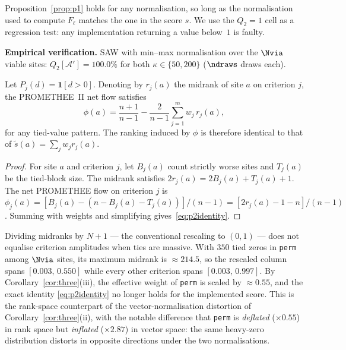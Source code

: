 \begin{remark}
Proposition~\ref{prop:p1} holds for any normalisation, so long as the
normalisation used to compute $F_\ell$ matches the one in the score $s$.
We use the $Q_2 = 1$ cell as a regression test: any implementation
returning a value below~$1$ is faulty.
\end{remark}

\noindent\textbf{Empirical verification.}
SAW with min--max normalisation over the $\Nvia$ viable sites:
$Q_2[\mathcal{A}'] = 100.0\%$ for both $\kappa \in \{50, 200\}$
($\ndraws$ draws each).



\begin{proposition}
\label{prop:p2}
Let $P_j(d) = \mathbf{1}[d > 0]$.
Denoting by $r_j(a)$ the midrank of site $a$ on criterion $j$, the
PROMETHEE~II net flow satisfies
\begin{equation}
  \label{eq:p2identity}
  \phi(a) = \frac{n+1}{n-1} - \frac{2}{n-1}\sum_{j=1}^m w_j\, r_j(a),
\end{equation}
for any tied-value pattern.
The ranking induced by $\phi$ is therefore identical to that of
$\tilde{s}(a) = \sum_j w_j r_j(a)$.
\end{proposition}

\begin{proof}
For site $a$ and criterion $j$, let $B_j(a)$ count strictly worse sites
and $T_j(a)$ be the tied-block size.
The midrank satisfies $2r_j(a) = 2B_j(a) + T_j(a) + 1$.
The net PROMETHEE flow on criterion $j$ is
$\phi_j(a) = [B_j(a) - (n - B_j(a) - T_j(a))]/(n-1)
            = [2r_j(a) - 1 - n]/(n-1)$.
Summing with weights and simplifying gives~\eqref{eq:p2identity}.
\end{proof}

\begin{remark}
\label{rem:p2normalization}
Dividing midranks by $N+1$ --- the conventional rescaling to $(0,1)$
--- does not equalise criterion amplitudes when ties are massive.
With $350$ tied zeros in \texttt{perm} among $\Nvia$ sites, its maximum
midrank is $\approx 214.5$, so the rescaled column spans
$[0.003,\,0.550]$ while every other criterion spans $[0.003,\,0.997]$.
By Corollary~\ref{cor:three}(iii), the effective weight of
\texttt{perm} is scaled by $\approx 0.55$, and the exact identity
\eqref{eq:p2identity} no longer holds for the implemented score.
This is the rank-space counterpart of the vector-normalisation
distortion of Corollary~\ref{cor:three}(ii), with the notable
difference that \texttt{perm} is \emph{deflated} ($\times 0.55$) in
rank space but \emph{inflated} ($\times 2.87$) in vector space: the
same heavy-zero distribution distorts in opposite directions under the
two normalisations.
\end{remark}

